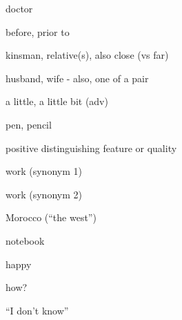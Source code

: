 \begin{flashcard}{\LARGE doctor}
\LARGE {}
\end{flashcard}
\begin{flashcard}{\LARGE before, prior to}
\LARGE {}
\end{flashcard}
\begin{flashcard}{\LARGE kinsman, relative(s), also close (vs far)}
\LARGE {}
\end{flashcard}
\begin{flashcard}{\LARGE husband, wife - also, one of a pair}
\LARGE {}
\end{flashcard}
\begin{flashcard}{\LARGE a little, a little bit (adv)}
\LARGE {}
\end{flashcard}
\begin{flashcard}{\LARGE pen, pencil}
\LARGE {}
\end{flashcard}
\begin{flashcard}{\LARGE positive distinguishing feature or quality}
\LARGE {}
\end{flashcard}
\begin{flashcard}{\LARGE work (synonym 1)}
\LARGE {}
\end{flashcard}
\begin{flashcard}{\LARGE work (synonym 2)}
\LARGE {}
\end{flashcard}
\begin{flashcard}{\LARGE Morocco (``the west'')}
\LARGE {}
\end{flashcard}
\begin{flashcard}{\LARGE notebook}
\LARGE {}
\end{flashcard}
\begin{flashcard}{\LARGE happy}
\LARGE {}
\end{flashcard}
\begin{flashcard}{\LARGE how?}
\LARGE {}
\end{flashcard}
\begin{flashcard}{\LARGE ``I don't know''}
\LARGE {}
\end{flashcard}
